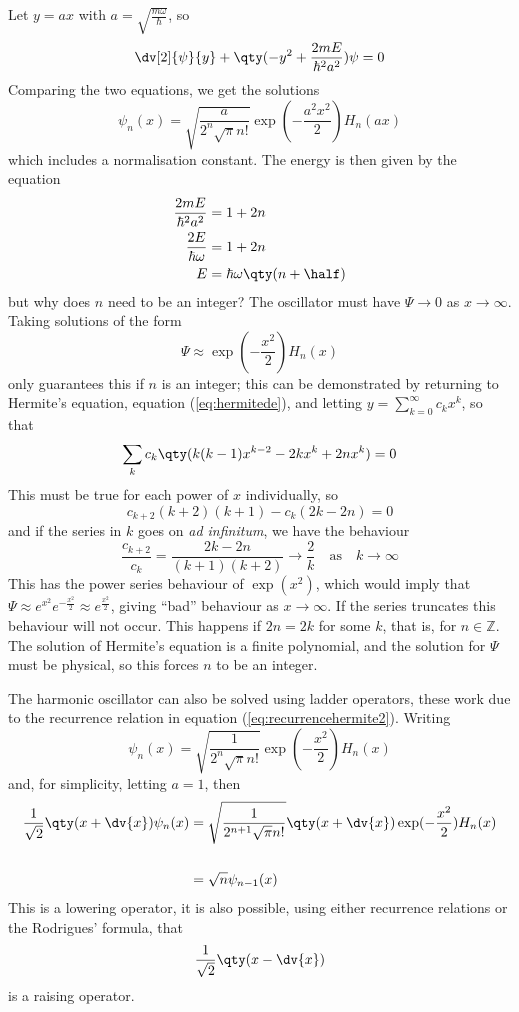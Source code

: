 Let $y = ax$ with $a = \sqrt{\frac{m \omega}{\hbar}}$, so
\[ \dv[2]{\psi}{y} + \qty( -y^2 + \frac{2mE}{\hbar^2 a^2} ) \psi =
0 \]
Comparing the two equations, we get the solutions
\begin{equation}
  \label{eq:2}
  \psi_n (x) = \sqrt{\frac{a}{2^n \sqrt{\pi} n!}} \exp( - \frac{a^2 x^2}{2} ) H_n(ax) 
\end{equation}
which includes a normalisation constant. The energy is then given by the equation
\begin{align}
  \frac{2 m E}{\hbar^2 a^2} &= 1 + 2n \nonumber\\
\frac{2E}{\hbar \omega} &= 1 + 2n \nonumber\\
E &= \hbar \omega \qty(n + \half)
\end{align}
but why does $n$ need to be an integer? The oscillator must have $\Psi
\to 0$ as $x \to \infty$. Taking solutions of the form
\[ \Psi \approx \exp( - \frac{x^2}{2} ) H_n(x) \] only guarantees this
if $n$ is an integer; this can be demonstrated by returning to
Hermite's equation, equation (\ref{eq:hermitede}), and letting $y =
\sum_{k=0}^{\infty} c_k x^k$, so that
\[ \sum_k c_k \qty( k(k-1) x^{k-2} - 2kx^k + 2nx^k ) = 0 \]
This must be true for each power of $x$ individually, so
\[ c_{k+2} (k+2) (k+1) - c_k(2k-2n)=0 \]
and if the series in $k$ goes on \emph{ad infinitum}, we have the behaviour
\begin{equation*}
  \frac{c_{k+2}}{c_k} = \frac{2k - 2n}{(k+1)(k+2)} \to \frac{2}{k} \quad \text{as} \quad k \to \infty
\end{equation*}
This has the power series behaviour of $\exp(x^2)$, which would imply
that $\Psi \approx e^{x^2} e^{-\frac{x^2}{2}} \approx
e^{\frac{x^2}{2}}$, giving ``bad'' behaviour as $x \to \infty$.  If
the series truncates this behaviour will not occur. This happens if
$2n=2k$ for some $k$, that is, for $n \in \mathbb{Z}$. The solution of
Hermite's equation is a finite polynomial, and the solution for $\Psi$
must be physical, so this forces $n$ to be an integer.

The harmonic oscillator can also be solved using ladder operators,
these work due to the recurrence relation in equation
(\ref{eq:recurrencehermite2}). Writing 
\[ \psi_n(x) = \sqrt{\frac{1}{2^n \sqrt{\pi} n!}} \exp( - \frac{x^2}{2} ) H_n(x) \]
and, for simplicity, letting $a=1$, then
\begin{align*}
 \frac{1}{\sqrt{2}} \qty(x + \dv{x}) \psi_n(x) &= \sqrt{\frac{1}{2^{n+1} \sqrt{\pi} n!}} \qty( x+ \dv{x}) \exp(- \frac{x^2}{2}) H_n(x) \\
\\ & = \sqrt{n} \psi_{n-1}(x)
\end{align*}
This is a lowering operator, it is also possible, using either recurrence relations or the Rodrigues' formula, that
\[ \frac{1}{\sqrt{2}} \qty( x - \dv{x} ) \] is a raising operator.

